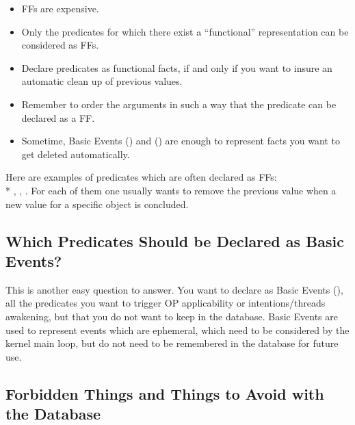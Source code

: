 \begin{itemize}

\item FFs are expensive.

\item Only the predicates for which there exist a ``functional''
representation can be considered as FFs.

\item Declare predicates as functional facts, if and only if you want to
insure an automatic clean up of previous values.

\item Remember to order the arguments in such a way that the predicate can
be declared as a FF.

\item Sometime, Basic Events () and () are enough to represent facts you want to get deleted
automatically.

\end{itemize}

Here are examples of predicates which are often declared as FFs:\\*
, , . For each of them one
usually wants to remove the previous value when a new value for a specific
object is concluded.

\subsection{Which Predicates Should be Declared as Basic Events?}

This is another easy question to answer. You want to declare as Basic
Events (), all the predicates you want to trigger OP
applicability or intentions/threads awakening, but that you do not want to
keep in the database. Basic Events are used to represent events which are ephemeral,
which need to be considered by the kernel main loop, but do not need to
be remembered in the database for future use.

\subsection{Forbidden Things and Things to Avoid with the Database}

